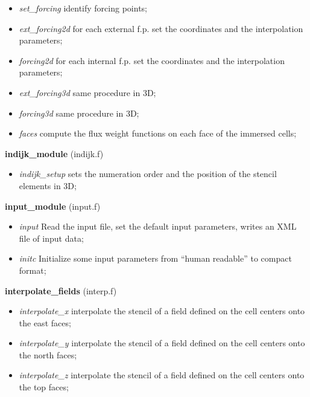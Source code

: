 \begin{itemize}
\item{\em set\_forcing} identify forcing points;
\item{\em ext\_forcing2d} for each external f.p. set the coordinates and the interpolation parameters;
\item{\em forcing2d} for each internal f.p. set the coordinates and the interpolation parameters;
\item{\em ext\_forcing3d} same procedure in 3D;
\item{\em forcing3d} same procedure in 3D;
\item{\em faces} compute the flux weight functions on each face of the immersed cells;
\end{itemize}
%
%
{\large{\bf indijk\_module}} (indijk.f) \\
\begin{itemize}
\item{\em indijk\_setup} sets the numeration order and the position of the stencil elements in 3D;
\end{itemize}
%
%
{\large{\bf input\_module}} (input.f)\\
\begin{itemize}
\item{\em input} Read the input file, set the default input parameters, writes an XML file of input data;
\item{\em initc} Initialize some input parameters from ``human readable'' to compact format;
\end{itemize}
%
%
{\large{\bf interpolate\_fields}} (interp.f)\\
\begin{itemize}
\item{\em interpolate\_x} interpolate the stencil of a field defined on the cell centers onto the east faces;
\item{\em interpolate\_y}  interpolate the stencil of a field defined on the cell centers onto the north faces;
\item{\em interpolate\_z}  interpolate the stencil of a field defined on the cell centers onto the top faces;
\end{itemize}
%
